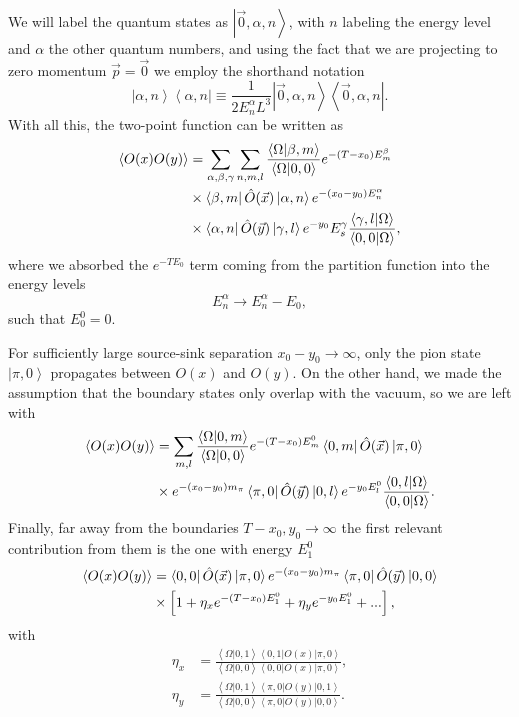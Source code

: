 We will label the quantum states as $\left|\vec{0},\alpha,n\right>$, with $n$ labeling the energy level and $\alpha$ the other quantum numbers, and using the fact that we are projecting to zero momentum $\vec{p}=\vec{0}$ we employ the shorthand notation 
\begin{equation}
\left|\alpha,n\right>\left<\alpha,n\right|\equiv\frac{1}{2E_n^{\alpha}L^3}\left|\vec{0},\alpha,n\right>\left<\vec{0},\alpha,n\right|.
\end{equation}
With all this, the two-point function can be written as
\begin{align}
\left<O(x)O(y)\right>&=\sum_{\alpha,\beta,\gamma}\sum_{n,m,l}\frac{\left<\Omega|\beta,m\right>}{\left<\Omega|0,0\right>}e^{-(T-x_0)E_m^{\beta}} \notag \\
&\times\left<\beta,m\right|\hat{O}(\vec{x})\left|\alpha,n\right>e^{-(x_0-y_0)E_n^{\alpha}} \notag \\
&\times\left<\alpha,n\right|\hat{O}(\vec{y})\left|\gamma,l\right>e^{-y_0}E_s^{\gamma}\frac{\left<\gamma,l|\Omega\right>}{\left<0,0|\Omega\right>},
\end{align}
where we absorbed the $e^{-TE_0}$ term coming from the partition function into the energy levels
\begin{equation}
E_n^{\alpha}\rightarrow E_n^{\alpha}-E_0,
\end{equation}
such that $E_0^0=0$.

For sufficiently large source-sink separation $x_0-y_0\rightarrow\infty$, only the pion state $\left|\pi,0\right>$ propagates between $O(x)$ and $O(y)$. On the other hand, we made the assumption that the boundary states only overlap with the vacuum, so we are left with
\begin{align}
\left<O(x)O(y)\right>&=\sum_{m,l}\frac{\left<\Omega|0,m\right>}{\left<\Omega|0,0\right>}e^{-(T-x_0)E_m^{0}}\left<0,m\right|\hat{O}(\vec{x})\left|\pi,0\right> \notag \\
&\times e^{-(x_0-y_0)m_{\pi}}\left<\pi,0\right|\hat{O}(\vec{y})\left|0,l\right>e^{-y_0E_l^{0}}\frac{\left<0,l|\Omega\right>}{\left<0,0|\Omega\right>}.
\end{align}
Finally, far away from the boundaries $T-x_0,y_0\rightarrow\infty$ the first relevant contribution from them is the one with energy $E_1^0$
\begin{align}
\label{ch_foundation:eq:2pt_spec}
\left<O(x)O(y)\right>&=\left<0,0\right|\hat{O}(\vec{x})\left|\pi,0\right>e^{-(x_0-y_0)m_{\pi}}\left<\pi,0\right|\hat{O}(\vec{y})\left|0,0\right> \notag \\
&\times\left[1+\eta_xe^{-(T-x_0)E_1^0}+\eta_ye^{-y_0E_1^0}+...\right],
\end{align}
with 
\begin{align}
\eta_x&=\frac{\left<\Omega|0,1\right>\left<0,1\right|O(x)\left|\pi,0\right>}{\left<\Omega|0,0\right>\left<0,0\right|O(x)\left|\pi,0\right>}, \\
\eta_y&=\frac{\left<\Omega|0,1\right>\left<\pi,0\right|O(y)\left|0,1\right>}{\left<\Omega|0,0\right>\left<\pi,0\right|O(y)\left|0,0\right>}.
\end{align}

